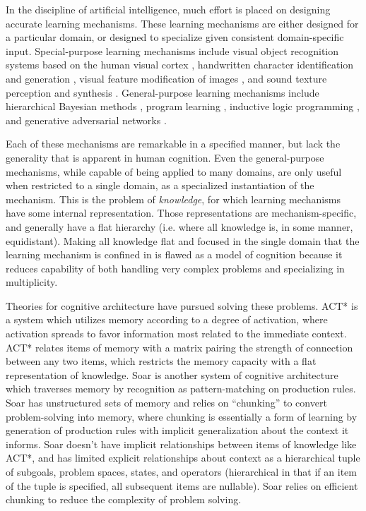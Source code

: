 \documentclass[11pt,letterpaper]{article}
\begin{document}
In the discipline of artificial intelligence, much effort is placed on
designing accurate learning mechanisms. These learning mechanisms are
either designed for a particular domain, or designed to specialize
given consistent domain-specific input. Special-purpose learning mechanisms
include visual object recognition systems based on the human visual cortex
\cite{serre07}, handwritten character identification and generation
\cite{lake15}, visual feature modification of images \cite{kulkarni15}, and
sound texture perception and synthesis \cite{mcdermott11}. General-purpose
learning mechanisms include hierarchical Bayesian methods
\cite{tenenbaum01}, program learning \cite{liang10}\cite{dechter13},
inductive logic programming \cite{lavrac94}\cite{muggleton15}, and
generative adversarial networks \cite{goodfellow14}.

Each of these mechanisms are remarkable in a specified manner, but lack the
generality that is apparent in human cognition. Even the general-purpose
mechanisms, while capable of being applied to many domains, are only useful
when restricted to a single domain, as a specialized instantiation of the
mechanism. This is the problem of \emph{knowledge}, for which learning
mechanisms have some internal representation. Those representations are
mechanism-specific, and generally have a flat hierarchy (i.e. where all
knowledge is, in some manner, equidistant). Making all knowledge flat and
focused in the single domain that the learning mechanism is confined in is
flawed as a model of cognition because it reduces capability of both
handling very complex problems and specializing in multiplicity.

Theories for cognitive architecture have pursued solving these problems.
ACT* \cite{anderson83} is a system which utilizes memory according to a
degree of activation, where activation spreads to favor information most
related to the immediate context. ACT* relates items of memory with a matrix
pairing the strength of connection between any two items, which restricts
the memory capacity with a flat representation of knowledge. Soar
\cite{newell94} is another system of cognitive architecture which traverses
memory by recognition as pattern-matching on production rules. Soar has
unstructured sets of memory and relies on ``chunking'' to convert
problem-solving into memory, where chunking is essentially a form of
learning by generation of production rules with implicit generalization
about the context it informs. Soar doesn't have implicit relationships
between items of knowledge like ACT*, and has limited explicit relationships
about context as a hierarchical tuple of subgoals, problem spaces, states, and
operators (hierarchical in that if an item of the tuple is specified, all
subsequent items are nullable). Soar relies on efficient chunking to reduce
the complexity of problem solving.
\end{document}
